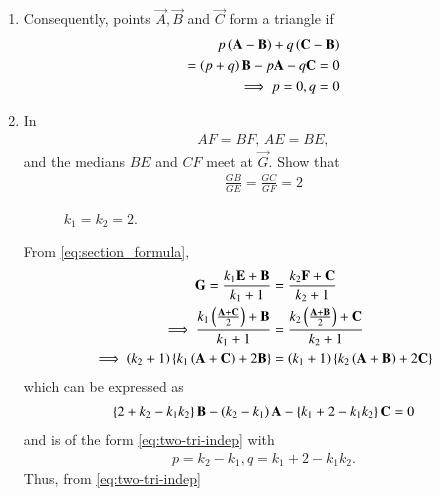\begin{enumerate}[label=\thesection.\arabic*.,ref=\thesection.\theenumi]
  \item Consequently, points $\vec{A},\vec{B}$ and $\vec{C}$ form a triangle  if 
	  \label{prop:two-tri-indep}
  \begin{align}
	  p\left(\mathbf{A}- \mathbf{B}\right) +q\left(\mathbf{C} -\mathbf{B}\right) 
	  \\
	  =\left(p+q\right)\mathbf{B}- p\mathbf{A} -q\mathbf{C} = 0
	  \\
	  \implies p=0, q=0
	  \label{eq:two-tri-indep}
  \end{align}
\iffalse
  \item In 
	\begin{align}
	AF = BF, \,
	AE = BE, 
	\end{align}
	and the medians $BE$ and $CF$ meet at $\vec{G}$.
	Show that 
	\begin{align}
\label{eq:tri_med_centroid_ratio}
	\frac{GB}{GE} = \frac{GC}{GF} = 2
	\end{align}
%
\begin{figure}[!ht]
	\begin{center}
		\resizebox{\columnwidth}{!}{}
	\end{center}
	\caption{$k_1=k_2=2$.}
	\label{fig:tri_med_isect}	
\end{figure}
\solution From 
	  \eqref{eq:section_formula},
  \begin{align}
	  \label{eq:section_formula-G}
\mathbf{G} = 
	   \frac{k_1\mathbf{E}+ \mathbf{B}}{k_1+1}
	  &= \frac{k_2\mathbf{F}+ \mathbf{C}}{k_2+1}
	  \\
	  \implies 
	   \frac{k_1\left(\frac{\mathbf{A}+\mathbf{C}}{2}\right)+ \mathbf{B}}{k_1+1}
	  &= \frac{k_2\left(\frac{\mathbf{A}+\mathbf{B}}{2}\right)+ \mathbf{C}}{k_2+1}
	  \\
	  \implies 
	\left(k_2+1\right)   \left\{k_1\left({\mathbf{A}+\mathbf{C}}\right)+ 2\mathbf{B}\right\}
	  &= \left(k_1+1\right)\left\{k_2\left({\mathbf{A}+\mathbf{B}}\right)+ 2\mathbf{C}\right\}
  \end{align}
  which can be expressed as
  \begin{align}
	  \left\{2 + k_2- k_1k_2 \right\}\mathbf{B}-\left(k_2-k_1\right)\mathbf{A}  - \left\{k_1 +2 - k_1k_2\right\}\mathbf{C}
	  =0
  \end{align}
  and is of the form
	  \eqref{eq:two-tri-indep}
	  with 
  \begin{align}
	  p = {k_2-k_1}, q = {k_1 +2 - k_1k_2}.
  \end{align}
  Thus, from 
	  \eqref{eq:two-tri-indep}
  \begin{align}

\end{align}
\end{enumerate}
